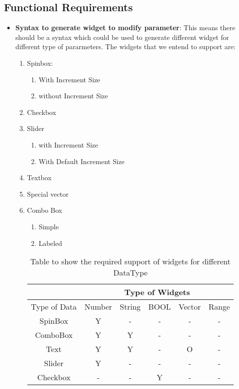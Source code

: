 \subsection{Functional Requirements}
\begin{itemize}
	\item {\bf Syntax to generate widget to modify parameter}: This means there should be a syntax which could be used to generate different widget for different type of pararmeters.
	The widgets that we entend to support are: 
	\begin{enumerate} 
		\item Spinbox:
			\begin{enumerate}
				\item With Increment Size
				\item without Increment Size 
			\end{enumerate} 
		\item Checkbox 
		\item Slider
			\begin{enumerate}
				\item with Increment Size
				\item With Default Increment Size
			\end{enumerate}
		\item Textbox
		\item Special vector 
		\item Combo Box
			\begin{enumerate}
				\item Simple
				\item Labeled 
			\end{enumerate}
	
	\begin{table}[h]
		\centering
		\begin{tabular}{ |c|c|c|c|c|c| }
			\hline
			& \multicolumn{5}{|c|}{Type of Widgets} \\
			\hline
			Type of Data&	Number&	String&	BOOL &Vector &Range	 \\ [0.5ex]
			\hline 
			SpinBox&Y&	-&	-&	-&	- \\ \hline
			ComboBox&	Y&	Y&	-&	-&	- \\ \hline
			Text&	Y&	Y&	-&	O&	- \\ \hline
			Slider&	Y&	-&	-&	-&	- \\ \hline
			Checkbox&	-&	-&	Y&	-&	- \\ [1ex]
			\hline
		\end{tabular}
		\caption{Table to show the required support of widgets for different DataType}
		\label{table2}
	\end{table}
	

\end{enumerate}
\end{itemize}
